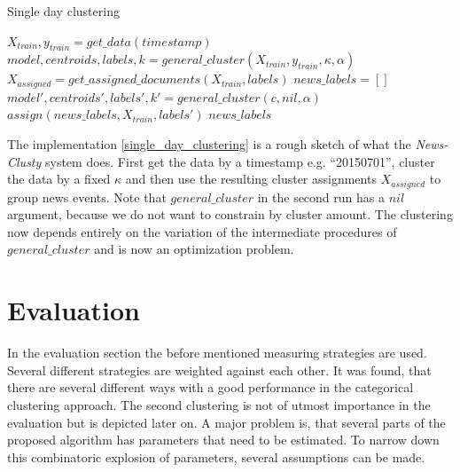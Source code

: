   \begin{algorithm}[H]
  \begin{algorithmic}[1]
    \caption{Single day clustering}\label{single_day_clustering}
      \State $X_{train},y_{train} = get\_data(timestamp)$
      \State $model,centroids,labels,k = general\_cluster(X_{train},y_{train},\kappa,\alpha)$
      \State $X_{assigned} = get\_assigned\_documents(X_{train},labels)$
      \State $news\_labels = []$
        \State $model',centroids',labels',k' = general\_cluster(c,nil,\alpha)$
        \State $assign(news\_labels, X_{train}, labels')$
      \EndFor
      \State \Return $news\_labels$
  \end{algorithmic}
  \end{algorithm}

The implementation \ref{single_day_clustering} is a rough sketch of what the \emph{News-Clusty} system does. First get the data by a timestamp e.g. ``20150701'', cluster the data by a fixed $\kappa$ and then use the resulting cluster assignments $X_{assigned}$ to group news events. Note that $general\_cluster$ in the second run has a $nil$ argument, because we do not want to constrain by cluster amount. The clustering now depends entirely on the variation of the intermediate procedures of $general\_cluster$ and is now an optimization problem. 

\section{Evaluation}
In the evaluation section the before mentioned measuring strategies are used. Several different strategies are weighted against each other. It was found, that there are several different ways with a good performance in the categorical clustering approach. The second clustering is not of utmost importance in the evaluation but is depicted later on. A major problem is, that several parts of the proposed algorithm has parameters that need to be estimated. To narrow down this combinatoric explosion of parameters, several assumptions can be made.

